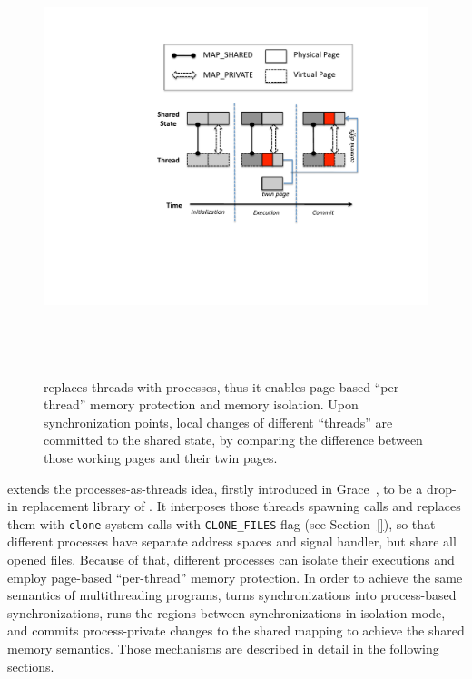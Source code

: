 \label{sec:sheriffframework}


%
\begin{figure}[!t]
\centering
\includegraphics[height=5in]{sheriff/figure/sheriffframework.pdf}
\caption{
\Sheriff{} replaces threads with processes, thus it enables page-based ``per-thread'' memory protection and memory isolation. Upon synchronization points, local changes of different ``threads'' are committed to the shared state, by comparing the difference between those working pages and their twin pages. \label{fig:overview}}
\end{figure}

\sheriff{} extends the processes-as-threads idea, firstly introduced in Grace~\cite{grace}, to be a drop-in replacement library of \pthreads{}. It interposes those threads spawning calls and replaces them with \texttt{clone} system calls with \texttt{CLONE\_FILES} flag (see Section~\ref{}), so that different processes have separate address spaces and signal handler, but share all opened files. Because of that, different processes can isolate their executions and employ page-based ``per-thread'' memory protection. In order to achieve the same semantics of multithreading programs, \sheriff{} turns synchronizations into process-based synchronizations, runs the regions between synchronizations in isolation mode, and commits process-private changes to the shared mapping to achieve the shared memory semantics. Those mechanisms are described in detail in the following sections. 

